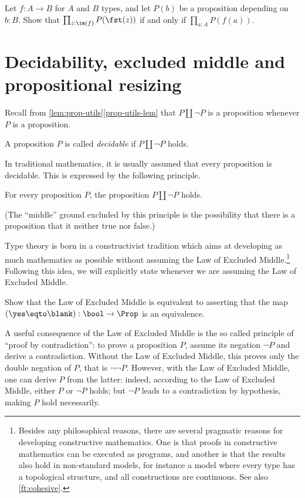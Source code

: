 \begin{xca}\label{xca:all-prop-image}
Let $f:A\to B$ for $A$ and $B$ types, and let $P(b)$ be a proposition
depending on $b:B$.
Show that $\prod_{z:\im(f)} P(\fst(z))$ if and only if $\prod_{a:A} P(f(a))$.
\end{xca}



\section{Decidability, excluded middle and propositional resizing}
\label{sec:decidability}

Recall from \cref{lem:prop-utils}\ref{prop-utils-lem} that $P\amalg \neg P$ is a proposition whenever $P$ is a proposition.
\begin{definition}\label{def:decidability}
  A proposition $P$ is called \emph{decidable}
  if $P\amalg\neg P$ holds.
\end{definition}
In traditional mathematics, it is usually assumed that
every proposition is decidable.
This is expressed by the following principle.
\begin{principle}
  \label{pri:lem}%
  For every proposition $P$, the proposition $P \amalg \neg P$ holds.
\end{principle}

(The ``middle'' ground excluded by this principle is the possibility that there
is a proposition that it neither true nor false.)

Type theory is born
in a constructivist tradition
which aims at developing as much mathematics as
possible without assuming the Law of Excluded Middle.\footnote{%
  Besides any philosophical reasons,
  there are several pragmatic reasons
  for developing constructive mathematics.
  One is that proofs in constructive mathematics
  can be executed as programs,
  and another is that the results also hold in non-standard models,
  for instance a model where every type has a topological structure,
  and all constructions are continuous.
  See also \cref{ft:cohesive}.}
Following this idea, we will
explicitly state whenever we are assuming the Law of Excluded Middle.
\begin{xca}\label{xca:lem-prop}
  Show that the Law of Excluded Middle is equivalent to asserting
  that the map $(\yes \eqto \blank) : \bool \to \Prop$
  is an equivalence.
\end{xca}
A useful consequence of the Law of Excluded Middle is the so called principle of ``proof by
contradiction'': to prove a proposition $P$, assume its negation $\neg P$
and derive a contradiction. Without the Law of Excluded Middle, this proves only the double negation of
$P$, that is $\neg \neg P$.  However, with the Law of Excluded Middle, one can derive $P$
from the latter: indeed, according to the Law of Excluded Middle, either $P$ or $\neg P$ holds;
but $\neg P$ leads to a contradiction by hypothesis, making $P$ hold
necessarily.

